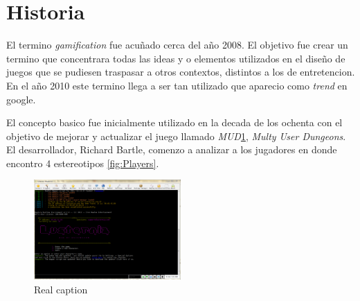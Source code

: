 \section{Historia}

El termino \emph{gamification} fue acuñado cerca del año 2008\cite{DefineGamefication}. 
El objetivo fue crear un termino que concentrara todas las ideas y o elementos utilizados en el 
diseño de juegos que se pudiesen traspasar a otros contextos, distintos a los de entretencion. 
En el año 2010 este termino llega a ser tan utilizado que aparecio como \emph{trend} en google\cite{LiCap1.3}.

El concepto basico fue inicialmente utilizado en la decada de los ochenta con el objetivo 
de mejorar y actualizar el juego llamado \emph{MUD}\ref{fig:MudClient}, \emph{Multy User Dungeons}. El desarrollador, 
Richard Bartle, comenzo a analizar a los jugadores en donde encontro 4 estereotipos \ref{fig:Players}.

\begin{figure}[!htb]
  \centering
  \includegraphics[width=0.5\textwidth]{images/mudclient.png}
  \caption[Caption for LOF]{Real caption\footnotemark}
  \label{fig:MudClient}
\end{figure}




